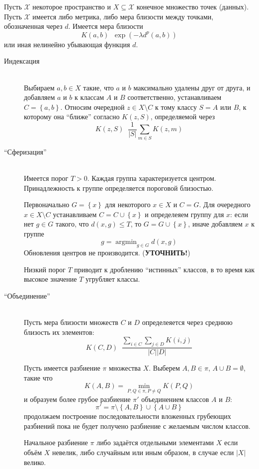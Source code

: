 \documentclass[a4paper]{article}
\newcommand{\obj}[1]{{\left\{ #1 \right \}}}
\newcommand{\brac}[1]{{\left ( #1 \right )}}
\newcommand{\abs}[1]{{\left | #1 \right |}}
\newcommand{\Xcal}{\mathcal{X}}
\newcommand{\defn}{\mathop{\overset{\Delta}{=}}\nolimits}
\begin{document}
Пусть $\Xcal$ некоторое пространство и $X\subseteq \Xcal$ конечное множество точек (данных).
Пусть $\Xcal$ имеется либо метрика, либо мера близости между точками, обозначенная через $d$.
Имеется мера близости \[K(a,b) \defn \exp\brac{ -\lambda d^p(a,b) }\]
или иная нелинейно убывающая функция $d$.
\begin{description}
\item[Индексация] \hfill \\
Выбираем $a,b\in X$ такие, что $a$ и $b$ максимально удалены друг от друга,
и добавляем $a$ и $b$ к классам $A$ и $B$ соответственно,
устанавливаем $C = \obj{a,b}$. 
Относим очередной $z\in X\setminus C$ к тому классу $S=A$ или $B$, к которому она ``ближе'' согласно $K(z,S)$,
определяемой через \[K(z,S) \defn \frac{1}{\abs{S}} \sum_{m\in S} K(z,m)\]

\item[``Сферизация''] \hfill \\
Имеется порог $T>0$. Каждая группа характеризуется центром.
Принадлежность к группе определяется пороговой близостью.

Первоначально $G = \obj{x}$ для некоторого $x\in X$ и $C=G$.
Для очередного $x\in X\setminus C$ устанавливаем $C = C\cup \obj{x}$ и определеяем группу для $x$:
если нет $g\in G$ такого, что $d(x,g)\leq T$, то $G = G\cup \obj{x}$, иначе добавляем $x$ к группе \[g = \mathop{\text{argmin}}_{g\in G} d(x,g)\]
Обновления центров не производится. (\textbf{УТОЧНИТЬ!})

Низкий порог $T$ приводит к дроблению ``истинных'' классов, в то время как высокое значение $T$ угрубляет классы.

\item[``Объединение'']\hfill \\
Пусть мера близости множеств $C$ и $D$ определеяется через среднюю близость их элементов: \[K(C,D) \defn \frac{ \sum_{i\in C}\sum_{j\in D} K(i,j)}{\abs{C} \abs{D}}\]

Пусть имеется разбиение $\pi$ множества $X$.
Выберем $A,B\in \pi$, $A\cup B = \emptyset$, такие что \[K(A,B) = \min_{P,Q\in \pi, P\neq Q} K(P,Q)\]
и образуем более грубое разбиение $\pi'$ объединением классов $A$ и $B$: \[\pi ' = \pi\setminus\obj{ A, B } \cup \obj{ A\cup B }\]
продолжаем построение последовательности вложенных грубеющих разбиений пока не будет получено разбиение с желаемым числом классов.

Начальное разбиение $\pi$ либо задаётся отдельными элементами $X$ если объём $X$ невелик, либо случайным или иным образом, в случае если $\abs{X}$ велико.


\end{description}
\end{document}
